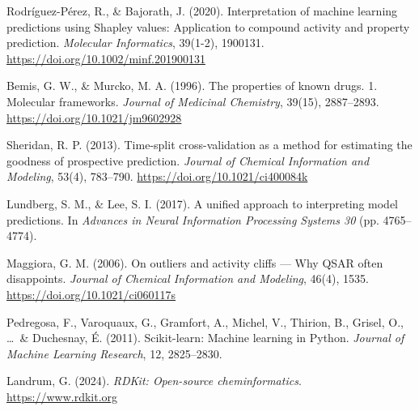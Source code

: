 \begin{enumerate}[leftmargin=2.2em, itemsep=0.75em, label={[\arabic*]}]
\item Rodríguez-Pérez, R., \& Bajorath, J. (2020). Interpretation of machine learning predictions using Shapley values: Application to compound activity and property prediction. \textit{Molecular Informatics}, 39(1-2), 1900131. \url{https://doi.org/10.1002/minf.201900131}

\item Bemis, G. W., \& Murcko, M. A. (1996). The properties of known drugs. 1. Molecular frameworks. \textit{Journal of Medicinal Chemistry}, 39(15), 2887--2893. \url{https://doi.org/10.1021/jm9602928}

\item Sheridan, R. P. (2013). Time-split cross-validation as a method for estimating the goodness of prospective prediction. \textit{Journal of Chemical Information and Modeling}, 53(4), 783--790. \url{https://doi.org/10.1021/ci400084k}

\item Lundberg, S. M., \& Lee, S. I. (2017). A unified approach to interpreting model predictions. In \textit{Advances in Neural Information Processing Systems 30} (pp. 4765--4774).

\item Maggiora, G. M. (2006). On outliers and activity cliffs --- Why QSAR often disappoints. \textit{Journal of Chemical Information and Modeling}, 46(4), 1535. \url{https://doi.org/10.1021/ci060117s}

\item Pedregosa, F., Varoquaux, G., Gramfort, A., Michel, V., Thirion, B., Grisel, O., \ldots\ \& Duchesnay, É. (2011). Scikit-learn: Machine learning in Python. \textit{Journal of Machine Learning Research}, 12, 2825--2830.

\item Landrum, G. (2024). \textit{RDKit: Open-source cheminformatics}. \url{https://www.rdkit.org}

\end{enumerate}
